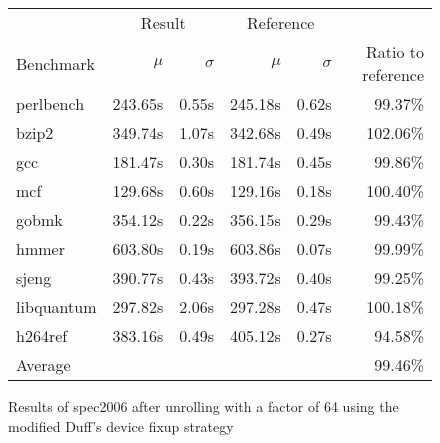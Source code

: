 \begin{figure}[h]
    \begin{center}
        \begin{tabular}{lrrrrr}
            \toprule
            & \multicolumn{2}{c}{Result} & \multicolumn{2}{c}{Reference}\\
            Benchmark & $\mu$ & $\sigma$ & $\mu$ & $\sigma$ & Ratio to reference\\
            \midrule
            perlbench & 243.65s & 0.55s & 245.18s & 0.62s & 99.37\%\\
            bzip2 & 349.74s & 1.07s & 342.68s & 0.49s & 102.06\%\\
            gcc & 181.47s & 0.30s & 181.74s & 0.45s & 99.86\%\\
            mcf & 129.68s & 0.60s & 129.16s & 0.18s & 100.40\%\\
            gobmk & 354.12s & 0.22s & 356.15s & 0.29s & 99.43\%\\
            hmmer & 603.80s & 0.19s & 603.86s & 0.07s & 99.99\%\\
            sjeng & 390.77s & 0.43s & 393.72s & 0.40s & 99.25\%\\
            libquantum & 297.82s & 2.06s & 297.28s & 0.47s & 100.18\%\\
            h264ref & 383.16s & 0.49s & 405.12s & 0.27s & 94.58\%\\
            \midrule
            Average & & & & & 99.46\%\\
            \bottomrule
        \end{tabular}
    \end{center}
    \caption{Results of spec2006 after unrolling with a factor of 64 using the modified Duff's device fixup strategy}
    \label{fig:eval:perf:duff:64}
\end{figure}
